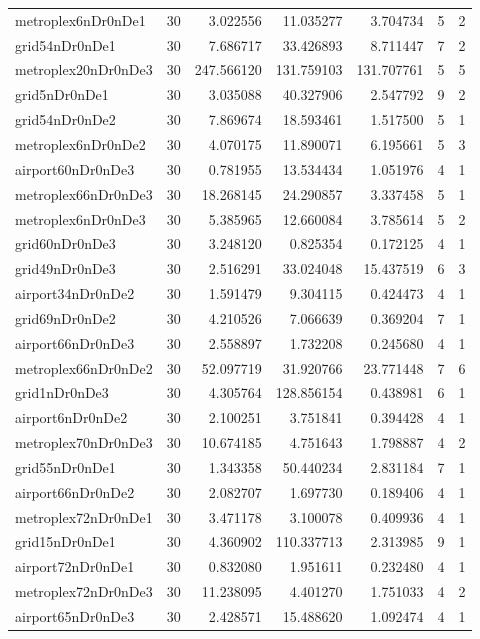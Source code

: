 \begin{longtable}{|l|r|r|r|r|r|r|}
metroplex6nDr0nDe1 & 30 & 3.022556 & 11.035277 & 3.704734 & 5 & 2 \\
grid54nDr0nDe1 & 30 & 7.686717 & 33.426893 & 8.711447 & 7 & 2 \\
metroplex20nDr0nDe3 & 30 & 247.566120 & 131.759103 & 131.707761 & 5 & 5 \\
grid5nDr0nDe1 & 30 & 3.035088 & 40.327906 & 2.547792 & 9 & 2 \\
grid54nDr0nDe2 & 30 & 7.869674 & 18.593461 & 1.517500 & 5 & 1 \\
metroplex6nDr0nDe2 & 30 & 4.070175 & 11.890071 & 6.195661 & 5 & 3 \\
airport60nDr0nDe3 & 30 & 0.781955 & 13.534434 & 1.051976 & 4 & 1 \\
metroplex66nDr0nDe3 & 30 & 18.268145 & 24.290857 & 3.337458 & 5 & 1 \\
metroplex6nDr0nDe3 & 30 & 5.385965 & 12.660084 & 3.785614 & 5 & 2 \\
grid60nDr0nDe3 & 30 & 3.248120 & 0.825354 & 0.172125 & 4 & 1 \\
grid49nDr0nDe3 & 30 & 2.516291 & 33.024048 & 15.437519 & 6 & 3 \\
airport34nDr0nDe2 & 30 & 1.591479 & 9.304115 & 0.424473 & 4 & 1 \\
grid69nDr0nDe2 & 30 & 4.210526 & 7.066639 & 0.369204 & 7 & 1 \\
airport66nDr0nDe3 & 30 & 2.558897 & 1.732208 & 0.245680 & 4 & 1 \\
metroplex66nDr0nDe2 & 30 & 52.097719 & 31.920766 & 23.771448 & 7 & 6 \\
grid1nDr0nDe3 & 30 & 4.305764 & 128.856154 & 0.438981 & 6 & 1 \\
airport6nDr0nDe2 & 30 & 2.100251 & 3.751841 & 0.394428 & 4 & 1 \\
metroplex70nDr0nDe3 & 30 & 10.674185 & 4.751643 & 1.798887 & 4 & 2 \\
grid55nDr0nDe1 & 30 & 1.343358 & 50.440234 & 2.831184 & 7 & 1 \\
airport66nDr0nDe2 & 30 & 2.082707 & 1.697730 & 0.189406 & 4 & 1 \\
metroplex72nDr0nDe1 & 30 & 3.471178 & 3.100078 & 0.409936 & 4 & 1 \\
grid15nDr0nDe1 & 30 & 4.360902 & 110.337713 & 2.313985 & 9 & 1 \\
airport72nDr0nDe1 & 30 & 0.832080 & 1.951611 & 0.232480 & 4 & 1 \\
metroplex72nDr0nDe3 & 30 & 11.238095 & 4.401270 & 1.751033 & 4 & 2 \\
airport65nDr0nDe3 & 30 & 2.428571 & 15.488620 & 1.092474 & 4 & 1 \\

\end{longtable}
